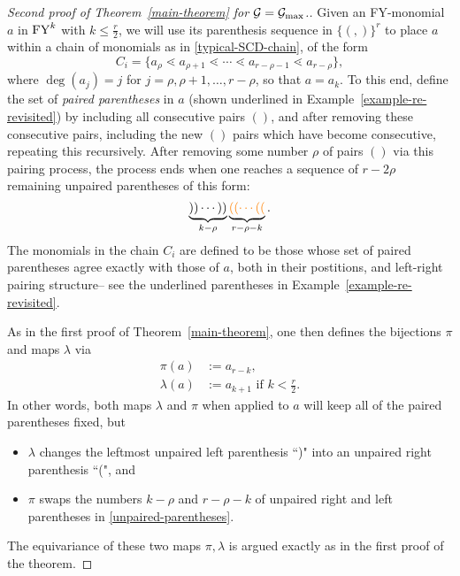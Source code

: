 \begin{proof}[Second proof of Theorem~\ref{main-theorem} for $\mathcal{G}=\mathcal{G}_{\max}$.]

Given an FY-monomial $a$ in $\mathrm{FY}^k$ with $k \leq \frac{r}{2}$, we will use its parenthesis sequence in $\{(,)\}^r$ to place $a$ within a chain of monomials as in \eqref{typical-SCD-chain}, of
the form
$$
C_i=\{ a_{\rho} \lessdot a_{\rho+1} \lessdot \cdots \lessdot a_{r-\rho-1} \lessdot a_{r-\rho} \},
$$
where $\deg(a_j)=j$ for $j=\rho,\rho+1,\ldots,r-\rho$,
so that $a=a_k$.  To this end, define the set of {\it paired parentheses} in $a$ (shown underlined in Example~\ref{example-re-revisited})
by including all consecutive pairs $()$, and after removing these
consecutive pairs, including the new $()$ pairs which have become consecutive, repeating this recursively.  After removing some number $\rho$ of pairs $()$ via this pairing process, the process ends when one reaches a sequence of $r -2 \rho$ remaining unpaired parentheses of this form:
\begin{equation}
\label{unpaired-parentheses}
\underbrace{)) \cdots ))}_{k-\rho}
\underbrace{{\color{orange}(( \cdots ((}}_{r-\rho-k}.
\end{equation}
The monomials in the chain $C_i$ are defined to
be those whose set of paired parentheses agree
exactly with those of $a$, both in their postitions, and left-right pairing structure-- see the underlined parentheses in Example~\ref{example-re-revisited}.  

As in the first proof of Theorem~\ref{main-theorem}, one then defines the bijections $\pi$ and maps $\lambda$ via
$$
\begin{aligned}
\pi(a)&:=a_{r-k},\\
\lambda(a)&:=a_{k+1}  \text{ if }k < \frac{r}{2}.
\end{aligned}
$$
In other words, both maps $\lambda$ and $\pi$
when applied to $a$ will keep all of the paired parentheses fixed, but 
\begin{itemize}
    \item $\lambda$ changes the leftmost unpaired left parenthesis ``)" into an unpaired right parenthesis ``{\color{orange}(}", and
    \item $\pi$ swaps the numbers $k-\rho$ and $r-\rho-k$ of unpaired right and left parentheses in \eqref{unpaired-parentheses}.
\end{itemize}

The equivariance of these two maps $\pi, \lambda$ is argued exactly as in the first proof of the theorem.
\end{proof}


